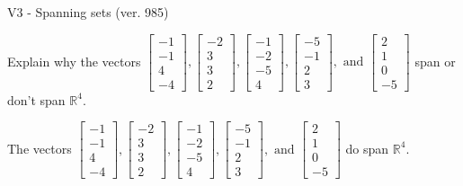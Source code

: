 \begin{exercise}
  \begin{exerciseTitle}V3 - Spanning sets (ver. 985)\end{exerciseTitle}
  \begin{exerciseStatement}
    Explain why the vectors \(\left[\begin{array}{r}
-1 \\
-1 \\
4 \\
-4
\end{array}\right] , \left[\begin{array}{r}
-2 \\
3 \\
3 \\
2
\end{array}\right] , \left[\begin{array}{r}
-1 \\
-2 \\
-5 \\
4
\end{array}\right] , \left[\begin{array}{r}
-5 \\
-1 \\
2 \\
3
\end{array}\right] , \text{ and } \left[\begin{array}{r}
2 \\
1 \\
0 \\
-5
\end{array}\right]\) span or don't span \(\mathbb{R}^4\). 
	


  \end{exerciseStatement}
  \begin{exerciseAnswer}
   The vectors \(\left[\begin{array}{r}
-1 \\
-1 \\
4 \\
-4
\end{array}\right] , \left[\begin{array}{r}
-2 \\
3 \\
3 \\
2
\end{array}\right] , \left[\begin{array}{r}
-1 \\
-2 \\
-5 \\
4
\end{array}\right] , \left[\begin{array}{r}
-5 \\
-1 \\
2 \\
3
\end{array}\right] , \text{ and } \left[\begin{array}{r}
2 \\
1 \\
0 \\
-5
\end{array}\right]\) 
  	 do  
	span \(\mathbb{R}^4\).
  



\end{exerciseAnswer}
\end{exercise}

